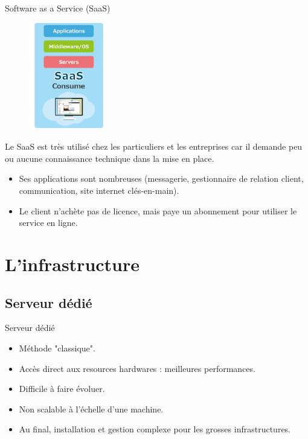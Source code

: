 \documentclass{beamer}
\begin{document}
\begin{frame}{Software as a Service (SaaS)}
    \begin{figure}
        \centering
        \includegraphics[width=0.30\textwidth]{images/services_saas.png}
    \end{figure}

    Le SaaS est très utilisé chez les particuliers et les entreprises car il
    demande peu ou aucune connaissance technique dans la mise en place.
    \pause

    \begin{itemize}
        \item {
        Ses applications sont nombreuses (messagerie, gestionnaire de relation client,
        communication, site internet clés-en-main).
        }\pause
        \item {
        Le client n'achète pas de licence, mais paye un abonnement
        pour utiliser le service en ligne.
        }
    \end{itemize}
\end{frame}

\section{L'infrastructure}

\subsection{Serveur dédié}

\begin{frame}{Serveur dédié}
    \begin{itemize}
        \item {
        Méthode "classique".
        }\pause
        \item {
        Accès direct aux resources hardwares : meilleures performances.
        }\pause
        \item {
        Difficile à faire évoluer.
        }\pause
        \item {
        Non scalable à l'échelle d'une machine.
        }\pause
        \item {
        Au final, installation et gestion complexe pour les grosses infrastructures.
        }
    \end{itemize}
\end{frame}
\end{document}
